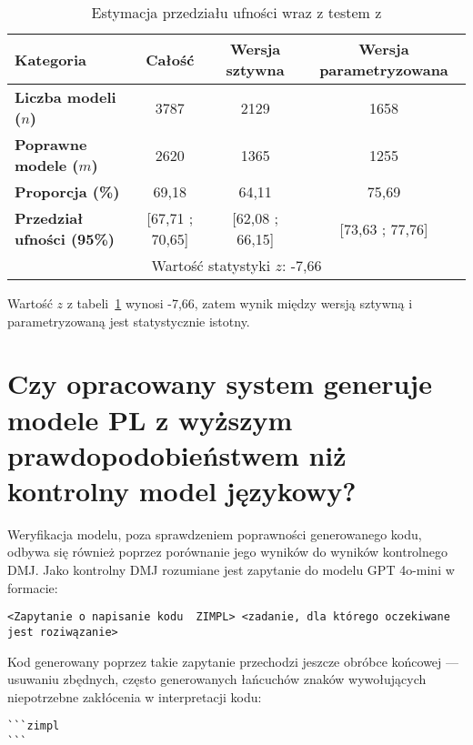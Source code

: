 \begin{table}[H]
\caption{Estymacja przedziału ufności wraz z testem z}\label{tab:experiment:analysis3}
\centering%
\begin{tabular}{|l|c|c|c|}
\hline
\textbf{Kategoria} & \textbf{Całość} & \textbf{Wersja sztywna} & \textbf{Wersja parametryzowana} \\
\hline
\textbf{Liczba modeli ($n$)} & 3787 & 2129 & 1658 \\
\hline
\textbf{Poprawne modele ($m$)} & 2620 & 1365 & 1255 \\
\hline
\textbf{Proporcja (\%)} & 69,18 & 64,11 & 75,69 \\
\hline
\textbf{Przedział ufności (95\%)} & [67,71 ; 70,65] & [62,08 ; 66,15] & [73,63 ; 77,76] \\
\hline
\multicolumn{4}{|c|}{Wartość statystyki \( z \): -7,66} \\
\hline
\end{tabular}
\end{table}

Wartość \( z \) z tabeli~\ref{tab:experiment:analysis3} wynosi -7,66, zatem wynik między wersją sztywną i parametryzowaną jest statystycznie istotny.

\section{Czy opracowany system generuje modele PL z wyższym prawdopodobieństwem niż kontrolny model językowy?}

Weryfikacja modelu, poza sprawdzeniem poprawności generowanego kodu, odbywa się również poprzez porównanie jego wyników do wyników kontrolnego DMJ. Jako kontrolny DMJ rozumiane jest zapytanie do modelu GPT 4o-mini w formacie:

\begin{lstlisting}[language=zimpl]
<Zapytanie o napisanie kodu  ZIMPL> <zadanie, dla którego oczekiwane jest roziwązanie>
\end{lstlisting}

Kod generowany poprzez takie zapytanie przechodzi jeszcze obróbce końcowej --- usuwaniu zbędnych, często generowanych łańcuchów znaków wywołujących niepotrzebne zakłócenia w interpretacji kodu:
\begin{lstlisting}[language=zimpl]
```zimpl
```
\end{lstlisting}

